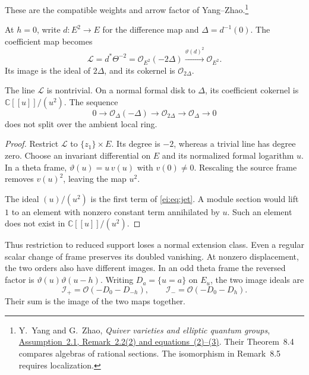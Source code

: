 These are the compatible weights and arrow factor of
Yang--Zhao.\footnote{Y.~Yang and G.~Zhao,
\emph{Quiver varieties and elliptic quantum groups},
\href{https://arxiv.org/abs/1708.01418}{Assumption~2.1,
Remark~2.2(2) and equations~(2)--(3)}.
Their Theorem~8.4 compares algebras of rational sections.
The isomorphism in Remark~8.5 requires localization.}

At $h=0$, write $d:E^2\to E$ for the difference map and
$\Delta=d^{-1}(0)$. The coefficient map becomes
\begin{equation}\label{ei:eq:doubled-pair}
 \mathcal L=d^*\Theta^{-2}
    =\mathcal O_{E^2}(-2\Delta)
 \xrightarrow{\vartheta(d)^2}\mathcal O_{E^2}.
\end{equation}
Its image is the ideal of $2\Delta$, and its cokernel is
$\mathcal O_{2\Delta}$.

\begin{proposition}\label{ei:prop:jet}
The line $\mathcal L$ is nontrivial. On a normal formal disk to
$\Delta$, its coefficient cokernel is $\mathbb C[[u]]/(u^2)$.
The sequence
\begin{equation}\label{ei:eq:jet}
 0\longrightarrow\mathcal O_\Delta(-\Delta)
 \longrightarrow\mathcal O_{2\Delta}
 \longrightarrow\mathcal O_\Delta\longrightarrow0
\end{equation}
does not split over the ambient local ring.
\end{proposition}

\begin{proof}
Restrict $\mathcal L$ to $\{z_1\}\times E$. Its degree is $-2$,
whereas a trivial line has degree zero.
Choose an invariant differential on $E$ and its normalized formal
logarithm $u$. In a theta frame,
$\vartheta(u)=u\,v(u)$ with $v(0)\ne0$.
Rescaling the source frame removes $v(u)^2$, leaving the map $u^2$.

The ideal $(u)/(u^2)$ is the first term of \eqref{ei:eq:jet}.
A module section would lift $1$ to an element with nonzero constant
term annihilated by $u$. Such an element does not exist in
$\mathbb C[[u]]/(u^2)$.
\end{proof}

Thus restriction to reduced support loses a normal extension class.
Even a regular scalar change of frame preserves its doubled vanishing.
At nonzero displacement, the two orders also have different images.
In an odd theta frame the reversed factor is
$\vartheta(u)\vartheta(u-h)$.
Writing $D_a=\{u=a\}$ on $E_u$, the two image ideals are
\[
 \mathcal I_+=\mathcal O(-D_0-D_{-h}),\qquad
 \mathcal I_-=\mathcal O(-D_0-D_h).
\]
Their sum is the image of the two maps together.

